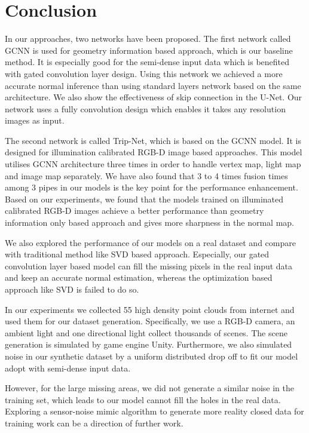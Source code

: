 
\chapter{Conclusion} %

\label{ch:06} %

In our approaches, two networks have been proposed. The first network called GCNN is used for geometry information based approach, which is our baseline method. It is especially good for the semi-dense input data which is benefited with gated convolution layer design.  Using this network we achieved a more accurate normal inference than using standard layers network based on the same architecture. We also show the effectiveness of skip connection in the U-Net. Our network uses a fully convolution design which enables it takes any resolution images as input. 

The second network is called Trip-Net, which is based on the GCNN model. It is designed for illumination calibrated RGB-D image based approaches. This model utilises GCNN architecture three times in order to handle vertex map, light map and image map separately. We have also found that 3 to 4 times fusion times among 3 pipes in our models is the key point for the performance enhancement.
Based on our experiments, we found that the models trained on illuminated calibrated RGB-D images achieve a  better performance than geometry information only based approach and gives more sharpness in the normal map.

We also explored the performance of our models on a real dataset and compare with traditional method like SVD based approach. Especially, our gated convolution layer based model can fill the missing pixels in the real input data and keep an accurate normal estimation, whereas the optimization based approach like SVD is failed to do so. 


In our experiments we collected 55 high density point clouds from internet and used them for our dataset generation. Specifically, we use a RGB-D camera, an ambient light and one directional light  collect thousands of scenes. The scene generation is simulated by game engine Unity. Furthermore, we also simulated noise in our synthetic dataset by a uniform distributed drop off to fit our model adopt with semi-dense input data.

However, for the large missing areas, we did not generate a similar noise in the training set, which leads to our model cannot fill the holes in the real data. Exploring a sensor-noise mimic algorithm to generate more reality closed data for training work can be a direction of further work.